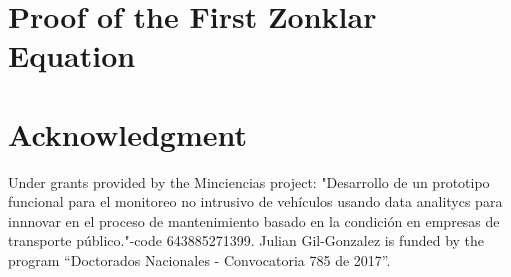 \documentclass[journal]{IEEEtran}
\begin{document}
%


\appendices

\section{Proof of the First Zonklar Equation}



\section*{Acknowledgment}
Under grants provided by the Minciencias project: "Desarrollo de un prototipo funcional para el monitoreo no intrusivo de veh\'iculos
usando data analitycs para innnovar en el proceso de mantenimiento basado en la condici\'on en empresas de transporte p\'ublico."-code 643885271399. Julian Gil-Gonzalez is funded by the program ``Doctorados Nacionales - Convocatoria 785 de 2017''.


\ifCLASSOPTIONcaptionsoff
  \newpage
\fi



\end{document}

